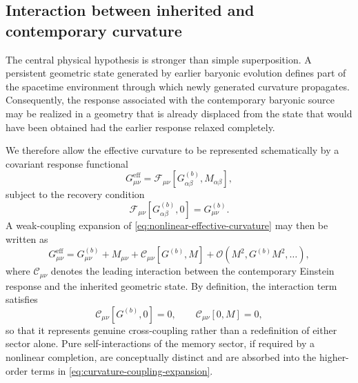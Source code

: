 
\subsection{Interaction between inherited and contemporary curvature}
\label{sec:curvature-interaction}

The central physical hypothesis is stronger than simple superposition.  A
persistent geometric state generated by earlier baryonic evolution defines part
of the spacetime environment through which newly generated curvature propagates.
Consequently, the response associated with the contemporary baryonic source may
be realized in a geometry that is already displaced from the state that would
have been obtained had the earlier response relaxed completely.

We therefore allow the effective curvature to be represented schematically by a
covariant response functional
\begin{equation}
    G_{\mu\nu}^{\mathrm{eff}}
    =
    \mathcal{F}_{\mu\nu}
    \!\left[
        G_{\alpha\beta}^{(b)},
        M_{\alpha\beta}
    \right],
    \label{eq:nonlinear-effective-curvature}
\end{equation}
subject to the recovery condition
\begin{equation}
    \mathcal{F}_{\mu\nu}
    \!\left[
        G_{\alpha\beta}^{(b)},0
    \right]
    =
    G_{\mu\nu}^{(b)}.
    \label{eq:interaction-gr-limit}
\end{equation}
A weak-coupling expansion of \eqref{eq:nonlinear-effective-curvature} may then
be written as
\begin{equation}
    G_{\mu\nu}^{\mathrm{eff}}
    =
    G_{\mu\nu}^{(b)}
    +
    M_{\mu\nu}
    +
    \mathcal{C}_{\mu\nu}
    \!\left[
        G^{(b)},M
    \right]
    +
    \mathcal{O}(M^2,G^{(b)}M^2,\ldots),
    \label{eq:curvature-coupling-expansion}
\end{equation}
where \(\mathcal{C}_{\mu\nu}\) denotes the leading interaction between the
contemporary Einstein response and the inherited geometric state.  By
definition, the interaction term satisfies
\begin{equation}
    \mathcal{C}_{\mu\nu}[G^{(b)},0]=0,
    \qquad
    \mathcal{C}_{\mu\nu}[0,M]=0,
    \label{eq:coupling-vanishing}
\end{equation}
so that it represents genuine cross-coupling rather than a redefinition of
either sector alone.  Pure self-interactions of the memory sector, if required
by a nonlinear completion, are conceptually distinct and are absorbed into the
higher-order terms in \eqref{eq:curvature-coupling-expansion}.

